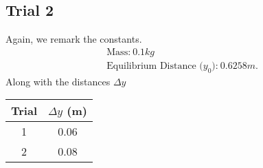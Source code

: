 \documentclass{report}
\begin{document}
    \bigbreak \noindent 
    \subsection{Trial 2}
    \bigbreak \noindent 
    Again, we remark the constants. 
    \begin{align*}
         &\text{Mass:}\ 0.1kg\\
         &\text{Equilibrium Distance ($y_{0}$):}\ 0.6258m
     .\end{align*}
     \bigbreak \noindent 
     Along with the distances $\Delta y$
     \begin{center}
         \begin{tabular}{c|c}
             Trial & $\Delta y$ (m) \\
             \hline
             1 & 0.06 \\
             2 & 0.08
         \end{tabular}
     \end{center}
     \tc{}

     \bigbreak \noindent 
\end{document}
